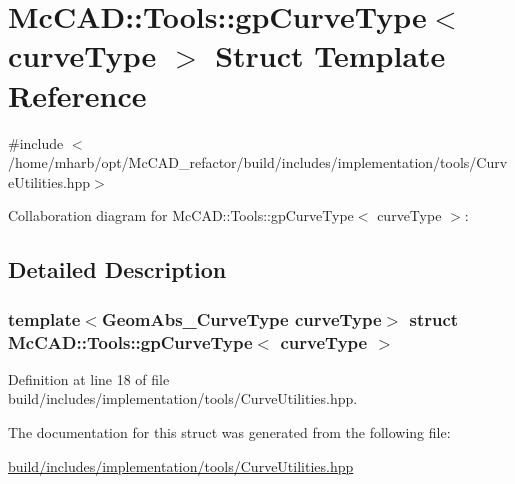 \hypertarget{structMcCAD_1_1Tools_1_1gpCurveType}{}\section{Mc\+C\+AD\+:\+:Tools\+:\+:gp\+Curve\+Type$<$ curve\+Type $>$ Struct Template Reference}
\label{structMcCAD_1_1Tools_1_1gpCurveType}


{\ttfamily \#include $<$/home/mharb/opt/\+Mc\+C\+A\+D\+\_\+refactor/build/includes/implementation/tools/\+Curve\+Utilities.\+hpp$>$}



Collaboration diagram for Mc\+C\+AD\+:\+:Tools\+:\+:gp\+Curve\+Type$<$ curve\+Type $>$\+:


\subsection{Detailed Description}
\subsubsection*{template$<$Geom\+Abs\+\_\+\+Curve\+Type curve\+Type$>$\newline
struct Mc\+C\+A\+D\+::\+Tools\+::gp\+Curve\+Type$<$ curve\+Type $>$}



Definition at line 18 of file build/includes/implementation/tools/\+Curve\+Utilities.\+hpp.



The documentation for this struct was generated from the following file\+:\begin{DoxyCompactItemize}
\item 
\hyperlink{build_2includes_2implementation_2tools_2CurveUtilities_8hpp}{build/includes/implementation/tools/\+Curve\+Utilities.\+hpp}\end{DoxyCompactItemize}
